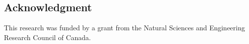 \documentclass[../main.tex]{subfiles}
\begin{document}
\begin{refsection}
%




\section*{Acknowledgment}

This research was funded by a grant from the Natural Sciences and Engineering Research Council of Canada.



\printbibliography[heading=subbibintoc]
\end{refsection}
\end{document}
